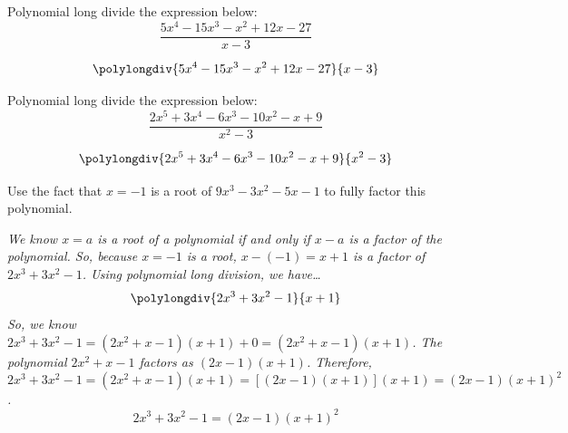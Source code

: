 \documentclass[11pt,letterpaper]{article}
\begin{document}
\newpage



 Polynomial long divide the expression below:
	\[
	\dfrac{5x^4 - 15x^3 - x^2 + 12x - 27}{x - 3}
	\] 
	
	\[
	\polylongdiv{5x^4 - 15x^3 - x^2 + 12x - 27}{x - 3}
	\]

 \par\vspace{0.6cm}



 Polynomial long divide the expression below:
	\[
	\dfrac{2x^5 + 3x^4 - 6x^3 - 10x^2 - x + 9}{x^2 - 3}
	\] \par\vspace{0.5cm}
	
	\[
	\polylongdiv{2x^5 + 3x^4 - 6x^3 - 10x^2 - x + 9}{x^2 - 3}
	\]

 \par\vspace{0.6cm}



 Use the fact that $x= -1$ is a root of $9x^3 - 3x^2 - 5x - 1$ to fully factor this polynomial. \par\vspace{0.3cm}

 {\itshape We know $x= a$ is a root of a polynomial if and only if $x - a$ is a factor of the polynomial. So, because $x= -1$ is a root, $x - (-1)= x + 1$ is a factor of $2x^3 + 3x^2 - 1$. Using polynomial long division, we have\dots
	\[
	\polylongdiv{2x^3 + 3x^2 - 1}{x + 1}
	\]
So, we know $2x^3 + 3x^2 - 1= (2x^2 + x - 1)(x + 1) + 0= (2x^2 + x - 1)(x + 1)$. The polynomial $2x^2 + x - 1$ factors as $(2x - 1)(x + 1)$. Therefore, $2x^3 + 3x^2 - 1= (2x^2 + x - 1)(x + 1)= [(2x - 1)(x + 1)](x + 1)= (2x - 1)(x + 1)^2$.
	\[
	\boxed{2x^3 + 3x^2 - 1= (2x - 1)(x + 1)^2}
	\]
}
\end{document}
